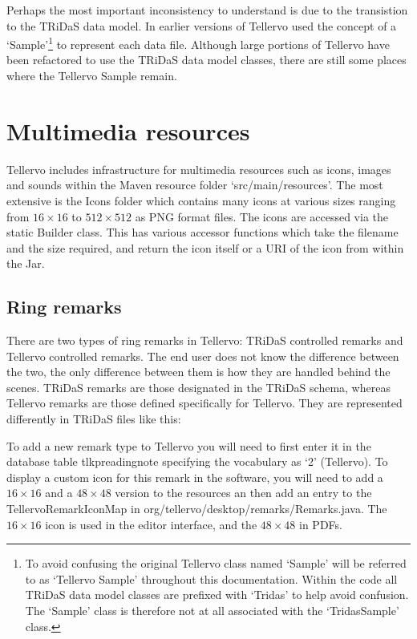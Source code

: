 Perhaps the most important inconsistency to understand is due to the transistion to the TRiDaS data model.  In earlier versions of Tellervo used the concept of a `Sample'\footnote{To avoid confusing the original Tellervo class named `Sample' will be referred to as `Tellervo Sample' throughout this documentation.  Within the code all TRiDaS data model classes are prefixed with `Tridas' to help avoid confusion.  The `Sample' class is therefore not at all associated with the `TridasSample' class.} to represent each data file.  Although large portions of Tellervo have been refactored to use the TRiDaS data model classes, there are still some places where the Tellervo Sample remain.  

\section{Multimedia resources}
Tellervo includes infrastructure for multimedia resources such as icons, images and sounds within the Maven resource folder `src/main/resources'.  The most extensive is the Icons folder which contains many icons at various sizes ranging from $16\times16$ to $512\times512$ as PNG format files.  The icons are accessed via the static Builder class.  This has various accessor functions which take the filename and the size required, and return the icon itself or a URI of the icon from within the Jar.

\subsection{Ring remarks}
There are two types of ring remarks in Tellervo: TRiDaS controlled remarks and Tellervo controlled remarks.  The end user does not know the difference between the two, the only difference between them is how they are handled behind the scenes.  TRiDaS remarks are those designated in the TRiDaS schema, whereas Tellervo remarks are those defined specifically for Tellervo.  They are represented differently in TRiDaS files like this: 

To add a new remark type to Tellervo you will need to first enter it in the database table tlkpreadingnote specifying the vocabulary as `2' (Tellervo).  To display a custom icon for this remark in the software, you will need to add a $16\times16$ and a $48\times48$ version to the resources an then add an entry to the TellervoRemarkIconMap in org/tellervo/desktop/remarks/Remarks.java.  The $16\times16$ icon is used in the editor interface, and the $48\times48$ in PDFs.

